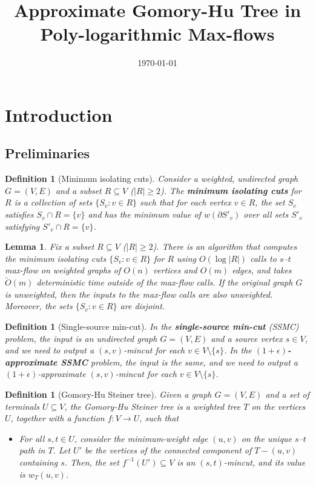 \documentclass{article}
\newcommand{\sm}{\setminus}
\newcommand{\s}{\subseteq}
\newcommand{\im}{\item}
\newcommand{\BI}{\begin{itemize}}
\newcommand{\EI}{\end{itemize}}
\newcommand{\inv}{^{-1}}
\newcommand{\e}{\epsilon}
\newcommand{\pt}{\partial}
\newcommand{\1}{\mathbbm 1}
\newtheorem{lemma}[theorem]{Lemma}
\newtheorem{definition}[theorem]{Definition}
\newcommand{\BL}{\begin{lemma}}
\newcommand{\EL}{\end{lemma}}
\newcommand{\BD}{\begin{definition}}
\newcommand{\ED}{\end{definition}}
\newcommand{\alert}{\textcolor{red}}
\newcommand{\tO}{\tilde{O}}
\renewcommand{\emph}[1]{\textbf{\textup{#1}}}
\begin{document}
\title{Approximate Gomory-Hu Tree in Poly-logarithmic Max-flows}
\author{}
\date{\today}
\maketitle

\section{Introduction}

\subsection{Preliminaries}

\BD[Minimum isolating cuts]
Consider a weighted, undirected graph $G=(V,E)$ and a subset $R\s V$ ($|R|\ge2$). The \emph{minimum isolating cuts} for $R$ is a collection of sets $\{S_v:v\in R\}$ such that for each vertex $v\in R$, the set $S_v$ satisfies $S_v\cap R=\{v\}$ and has the minimum value of $w(\pt S'_v)$ over all sets $S'_v$ satisfying $S'_v\cap R=\{v\}$.
\ED


\BL
Fix a subset $R\s V$ ($|R|\ge2$). There is an algorithm that computes the minimum isolating cuts $\{S_v:v\in R\}$ for $R$ using $O(\log|R|)$ calls to $s$--$t$ max-flow on weighted graphs of $O(n)$ vertices and $O(m)$ edges, and takes $\tO(m)$ deterministic time outside of the max-flow calls. If the original graph $G$ is unweighted, then the inputs to the max-flow calls are also unweighted. Moreover, the sets $\{S_v:v\in R\}$ are disjoint.
\EL


\BD[Single-source min-cut]
In the \emph{single-source min-cut} (SSMC) problem, the input is an undirected graph $G=(V,E)$ and a source vertex $s\in V$, and we need to output a $(s,v)$-mincut for each $v\in V\sm \{s\}$. In the \emph{$(1+\e)$-approximate SSMC} problem, the input is the same, and we need to output a $(1+\e)$-approximate $(s,v)$-mincut for each $v\in V\sm \{s\}$.
\ED


\BD[Gomory-Hu Steiner tree]
Given a graph $G=(V,E)$ and a set of terminals $U\s V$, the Gomory-Hu Steiner tree is a weighted tree $T$ on the vertices $U$, together with a function $f:V\to U$, such that
 \BI
 \im For all $s,t\in U$, consider the minimum-weight edge $(u,v)$ on the unique $s$--$t$ path in $T$. Let $U'$ be the vertices of the connected component of $T-(u,v)$ containing $s$.
Then, the set $f\inv(U')\s V$ is an $(s,t)$-mincut, and its value is $w_T(u,v)$.
 \EI
\ED
\end{document}
